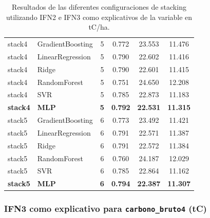 \begin{table}
\begin{tabular}{llcccc}
        \hline
        stack4 & GradientBoosting & 5 & 0.772 & 23.553 & 11.476 \\
        stack4 & LinearRegression & 5 & 0.790 & 22.602 & 11.416 \\
        stack4 & Ridge            & 5 & 0.790 & 22.601 & 11.415 \\
        stack4 & RandomForest     & 5 & 0.751 & 24.650 & 12.208 \\
        stack4 & SVR              & 5 & 0.785 & 22.873 & 11.183 \\
        \textbf{stack4} & \textbf{MLP}              & \textbf{5} & \textbf{0.792} & \textbf{22.531} & \textbf{11.315} \\
        \hline
        stack5 & GradientBoosting & 6 & 0.773 & 23.492 & 11.421 \\
        stack5 & LinearRegression & 6 & 0.791 & 22.571 & 11.387 \\
        stack5 & Ridge            & 6 & 0.791 & 22.572 & 11.384 \\
        stack5 & RandomForest     & 6 & 0.760 & 24.187 & 12.029 \\
        stack5 & SVR              & 6 & 0.785 & 22.864 & 11.162 \\
        \textbf{stack5} & \textbf{MLP} & \textbf{6} & \textbf{0.794} & \textbf{22.387} & \textbf{11.307} \\
        \hline
    \end{tabular}
    \caption{Resultados de las diferentes configuraciones de stacking utilizando IFN2 e IFN3 como explicativos de la variable en tC/ha.}
    \label{tab:stack_ifn2_ifn3c}
\end{table}
\subsubsection{IFN3 como explicativo para \texttt{carbono\_bruto4} (tC)}

